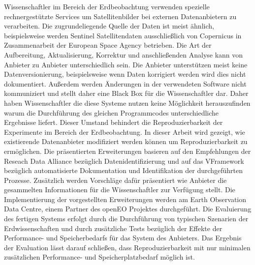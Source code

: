 \documentclass[draft,final]{vutinfth} %
\begin{document}
\begin{kurzfassung}
Wissenschaftler im Bereich der Erdbeobachtung verwenden spezielle rechnergestützte Services um Satellitenbilder bei externen Datenanbietern zu verarbeiten. Die zugrundeliegende Quelle der Daten ist meist ähnlich, beispielsweise werden Sentinel Satellitendaten ausschließlich von Copernicus in Zusammenarbeit der European Space Agency betrieben. Die Art der Aufbereitung, Aktualisierung, Korrektur und anschließenden Analyse kann von Anbieter zu Anbieter unterschiedlich sein. 
Die Anbieter unterstützen meist keine Datenversionierung, beispielsweise wenn Daten korrigiert werden wird dies nicht dokumentiert. Außerdem werden Änderungen in der verwendeten Software nicht kommuniziert und stellt daher eine Black Box für die Wissenschaftler dar. Daher haben Wissenschaftler die diese Systeme nutzen keine Möglichkeit herauszufinden warum die Durchführung des gleichen Programmcodes unterschiedliche Ergebnisse liefert. Dieser Umstand behindert die Reproduzierbarkeit der Experimente im Bereich der Erdbeobachtung. 
In dieser Arbeit wird gezeigt, wie existierende Datenanbieter modifiziert werden können um Reproduzierbarkeit zu ermöglichen. Die präsentierten Erweiterungen basieren auf den Empfehlungen der Reseach Data Alliance bezüglich Datenidentifizierung und auf das VFramework bezüglich automatisierte Dokumentation und Identifikation der durchgeführten Prozesse. Zusätzlich werden Vorschläge dafür präsentiert wie Anbieter die gesammelten Informationen für die Wissenschaftler zur Verfügung stellt. Die Implementierung der vorgestellten Erweiterungen werden am Earth Observation Data Centre, einem Partner des openEO Projektes durchgeführt. Die Evaluierung des fertigen Systems erfolgt durch die Durchführung von typischen Szenarien der Erdwissenschaften und durch zusätzliche Tests bezüglich der Effekte der Performance- und Speicherbedarfs für das System des Anbieters. Das Ergebnis der Evaluation lässt darauf schließen, dass Reproduzierbarkeit mit nur minimalen zusätzlichen Performance- und Speicherplatzbedarf möglich ist.          
\end{kurzfassung}
\end{document}
